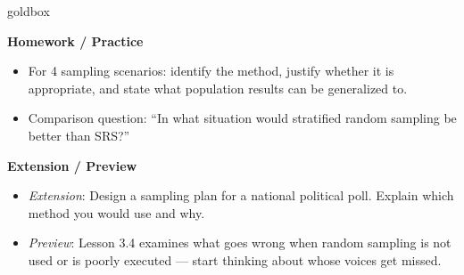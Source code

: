 \documentclass[10pt]{article}
\begin{document}
\begin{skillbox}{goldbox}
\begin{minipage}[t]{0.48\linewidth}
    \textbf{Homework / Practice}
    \begin{itemize}
        \item For 4 sampling scenarios: identify the method, justify whether it is
              appropriate, and state what population results can be generalized to.
        \item Comparison question: ``In what situation would stratified random sampling
              be better than SRS?''
    \end{itemize}
\end{minipage}
\hfill
\begin{minipage}[t]{0.48\linewidth}
    \textbf{Extension / Preview}
    \begin{itemize}
        \item \textit{Extension}: Design a sampling plan for a national political poll.
              Explain which method you would use and why.
        \item \textit{Preview}: Lesson 3.4 examines what goes wrong when random
              sampling is not used or is poorly executed --- start thinking about
              whose voices get missed.
    \end{itemize}
\end{minipage}
\end{skillbox}
\end{document}
